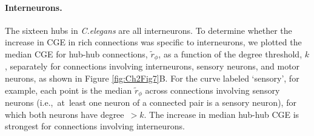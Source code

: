 \paragraph{Interneurons.}
The sixteen hubs in \textit{C.elegans} are all interneurons.
To determine whether the increase in CGE in rich connections was specific to interneurons, we plotted the median CGE for hub-hub connections, $\tilde{r}_\phi$, as a function of the degree threshold, $k$, separately for connections involving interneurons, sensory neurons, and motor neurons, as shown in Figure \ref{fig:Ch2Fig7}B.
For the curve labeled `sensory', for example, each point is the median $\tilde{r}_\phi$ across connections involving sensory neurons \mbox{(i.e., at least} one neuron of a connected pair is a sensory neuron), for which both neurons have \mbox{degree $>k$}.
The increase in median hub-hub CGE is strongest for connections involving interneurons.
